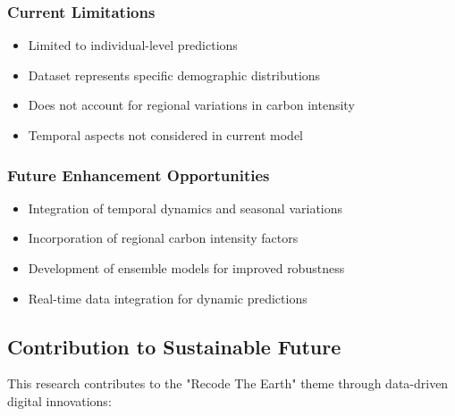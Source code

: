 \documentclass[12pt,a4paper]{article}
\begin{document}
\subsubsection{Current Limitations}
\begin{itemize}
    \item Limited to individual-level predictions
    \item Dataset represents specific demographic distributions
    \item Does not account for regional variations in carbon intensity
    \item Temporal aspects not considered in current model
\end{itemize}

\subsubsection{Future Enhancement Opportunities}
\begin{itemize}
    \item Integration of temporal dynamics and seasonal variations
    \item Incorporation of regional carbon intensity factors
    \item Development of ensemble models for improved robustness
    \item Real-time data integration for dynamic predictions
\end{itemize}

\subsection{Contribution to Sustainable Future}

This research contributes to the "Recode The Earth" theme through data-driven digital innovations:
\end{document}
